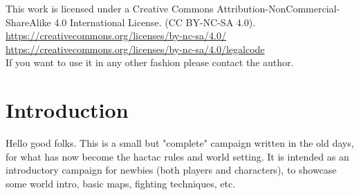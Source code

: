\documentclass[11pt, twoside, titlepage, a4paper]{report}
\renewcommand{\chaptermark}[1]{\markboth{#1}{}}
\begin{document}

\raggedbottom

This work is licensed under a Creative Commons Attribution-NonCommercial-ShareAlike 4.0 International License. (CC BY-NC-SA 4.0).\\
\url{https://creativecommons.org/licenses/by-nc-sa/4.0/} \\
\url{https://creativecommons.org/licenses/by-nc-sa/4.0/legalcode} \\
If you want to use it in any other fashion please contact the author.

\vspace*{\fill}


\thispagestyle{empty} %
\clearpage %
\flushbottom
\tableofcontents %
\newpage %



\setcounter{secnumdepth}{-1}





















\clearpage
\flushbottom
{}
\section*{Introduction}
\chaptermark{introduction}
Hello good folks. This is a small but "complete" campaign written in the old days, for what has now become the hactac rules and world setting. It is intended as an introductory campaign for newbies (both players and characters), to showcase some world intro, basic maps, fighting techniques, etc.
\end{document}
